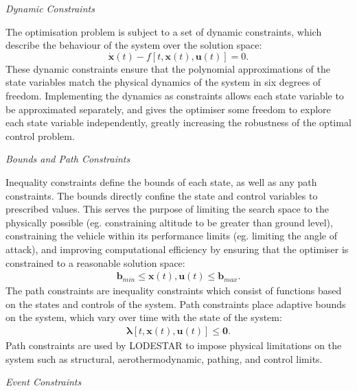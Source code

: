\noindent \textit{Dynamic Constraints}

\noindent 
The optimisation problem is subject to a set of dynamic constraints, which describe the behaviour of the system over the solution space:
\begin{equation} \label{eq:state}
\dot{\textbf{x}}(t) - f[t,\textbf{x}(t),\textbf{u}(t)] = 0.
\end{equation}
These dynamic constraints ensure that the polynomial approximations of the state variables match the physical dynamics of the system in six degrees of freedom. Implementing the dynamics as constraints allows each state variable to be approximated separately, and gives the optimiser some freedom to explore each state variable independently, greatly increasing the robustness of the optimal control problem.



\noindent \textit{Bounds and Path Constraints}

\noindent Inequality constraints define the bounds of each state, as well as any path constraints.
The bounds directly confine the state and control variables to prescribed values. This serves the purpose of limiting the search space to the physically possible (eg. constraining altitude to be greater than ground level), constraining the vehicle within its performance limits (eg. limiting the angle of attack), and improving computational efficiency by ensuring that the optimiser is constrained to a reasonable solution space:
\begin{eqnarray}
\mathbf{b}_{min} \leq \textbf{x}(t),\textbf{u}(t) \leq \mathbf{b}_{max}.
\end{eqnarray}
The path constraints are inequality constraints which consist of functions based on the states and controls of the system. Path constraints place adaptive bounds on the system, which vary over time with the state of the system:
\begin{eqnarray}
\mathbf{\lambda}[t,\textbf{x}(t),\textbf{u}(t)] \leq \textbf{0}.
\end{eqnarray}
Path constraints are used by LODESTAR to impose physical limitations on the system such as structural, aerothermodynamic, pathing, and control limits.

\noindent \textit{Event Constraints}

